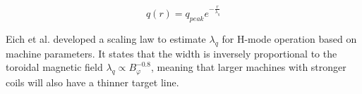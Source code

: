 \begin{equation}
	q(r) =  q_{peak}e^{-\frac{r}{\lambda_q}}
\end{equation}

Eich et al.\cite{eich2013scaling} developed a scaling law to estimate $\lambda_q$ for H-mode operation based on machine parameters. It states that the width is inversely proportional to the toroidal magnetic field $\lambda_q\propto B_\varphi^{-0.8}$, meaning that larger machines with stronger coils will also have a thinner target line. 






